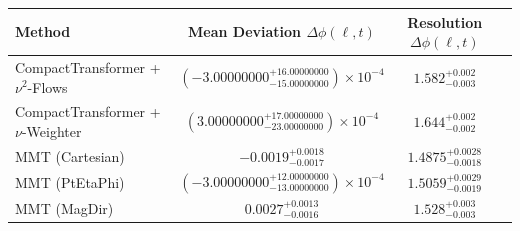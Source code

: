     \begin{tabular}{lccc}
        \toprule
        Method & Mean Deviation $\Delta\phi(\ell, t)$ & Resolution $\Delta\phi(\ell, t)$ \\
        \midrule
        CompactTransformer + $\nu^2$-Flows & $(-3.00000000^{+16.00000000}_{-15.00000000})\times 10^{-4}$ & $1.582^{+0.002}_{-0.003}$ \\
        CompactTransformer + $\nu$-Weighter & $(3.00000000^{+17.00000000}_{-23.00000000})\times 10^{-4}$ & $1.644^{+0.002}_{-0.002}$ \\
        MMT (Cartesian) & $-0.0019^{+0.0018}_{-0.0017}$ & $1.4875^{+0.0028}_{-0.0018}$ \\
        MMT (PtEtaPhi) & $(-3.00000000^{+12.00000000}_{-13.00000000})\times 10^{-4}$ & $1.5059^{+0.0029}_{-0.0019}$ \\
        MMT (MagDir) & $0.0027^{+0.0013}_{-0.0016}$ & $1.528^{+0.003}_{-0.003}$ \\
        \bottomrule
    \end{tabular}